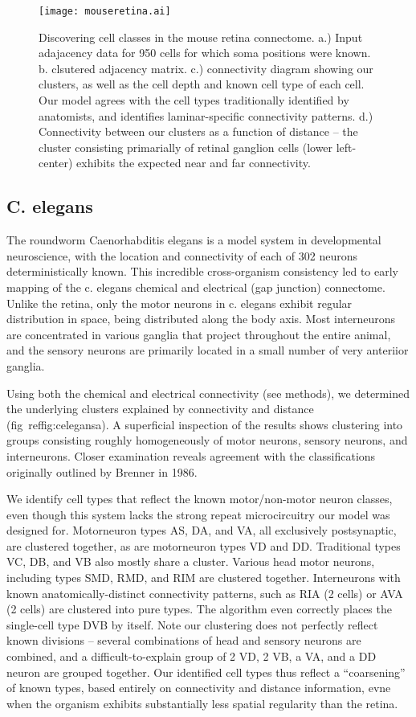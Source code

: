 \documentclass{article}
\begin{document}
\begin{figure}
  \centering 
  \centerline{\texttt{[image: mouseretina.ai]}}
  \caption{Discovering cell classes in the mouse retina connectome. 
a.) Input adajacency data for 950 cells for which soma positions were known. b. clsutered adjacency matrix. c.) connectivity diagram showing our clusters, as
well as the cell depth and known cell type of each cell. Our model agrees
with the cell types traditionally identified by anatomists, and identifies 
laminar-specific connectivity patterns. d.) Connectivity between our
clusters as a function of distance -- the cluster consisting primarially of
retinal ganglion cells (lower left-center) exhibits the expected near and
far connectivity.}
\label{fig:mouseretina}
\end{figure}

\subsection{C. elegans}

The roundworm Caenorhabditis elegans is a model system in
developmental neuroscience\autocite{White1986}, with the location and
connectivity of each of 302 neurons deterministically known. This
incredible cross-organism consistency led to early mapping of the
c. elegans chemical and electrical (gap junction) connectome. Unlike
the retina, only the motor neurons in c. elegans exhibit regular
distribution in space, being distributed along the body axis. Most
interneurons are concentrated in various ganglia that project
throughout the entire animal, and the sensory neurons are primarily
located in a small number of very anteriior ganglia. 

Using both the chemical and electrical connectivity (see methods), we
determined the underlying clusters explained by connectivity and
distance (fig~ref{fig:celegans}a). A superficial inspection of the results shows
clustering into groups consisting roughly homogeneously of motor
neurons, sensory neurons, and interneurons. Closer examination reveals
agreement with the classifications originally outlined by Brenner in
1986.  

We identify cell types that reflect the known motor/non-motor neuron
classes, even though this system lacks the strong repeat
microcircuitry our model was designed for.  Motorneuron types AS, DA,
and VA, all exclusively postsynaptic, are clustered together, as are
motorneuron types VD and DD. Traditional types VC, DB, and VB also
mostly share a cluster. Various head motor neurons, including types
SMD, RMD, and RIM are clustered together. Interneurons with known
anatomically-distinct connectivity patterns, such as RIA (2 cells) or
AVA (2 cells) are clustered into pure types. The algorithm even
correctly places the single-cell type DVB by itself. Note our
clustering does not perfectly reflect known divisions -- several
combinations of head and sensory neurons are combined, and a
difficult-to-explain group of 2 VD, 2 VB, a VA, and a DD neuron are
grouped together. Our identified cell types thus reflect a
``coarsening'' of known types, based entirely on connectivity and
distance information, evne when the organism exhibits substantially
less spatial regularity than the retina. 
\end{document}
